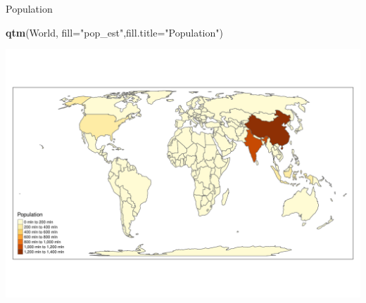 \documentclass[
  ignorenonframetext,
]{beamer}
\newenvironment{Shaded}{\begin{snugshade}}{\end{snugshade}}
\newcommand{\DataTypeTok}[1]{\textcolor[rgb]{0.13,0.29,0.53}{#1}}
\newcommand{\KeywordTok}[1]{\textcolor[rgb]{0.13,0.29,0.53}{\textbf{#1}}}
\newcommand{\NormalTok}[1]{#1}
\newcommand{\StringTok}[1]{\textcolor[rgb]{0.31,0.60,0.02}{#1}}
\begin{document}
\begin{frame}[fragile]{Population}
\protect\hypertarget{population-1}{}
\begin{Shaded}
\begin{Highlighting}[]
\KeywordTok{qtm}\NormalTok{(World, }\DataTypeTok{fill=}\StringTok{"pop\_est"}\NormalTok{,}\DataTypeTok{fill.title=}\StringTok{"Population"}\NormalTok{) }
\end{Highlighting}
\end{Shaded}

\includegraphics{quick_high_quality_maps_files/figure-beamer/unnamed-chunk-10-1.pdf}
\end{frame}
\end{document}

